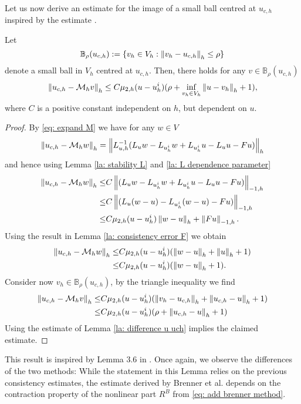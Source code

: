 Let us now derive an estimate for the image of a small ball centred at $u_{c,h}$ inspired by the estimate \cite[Lemma 3.6]{BGN+2011}.
\begin{lemma} \label{la: mapping property of M}
	Let 
	\[
		\mathbb B_\rho(u_{c,h}):=\{v_h \in V_h: \left\lVert v_h - u_{c,h} \right\rVert_{h} \leq \rho\}
	\]
	denote a small ball in $V_h$ centred at $u_{c,h}$. 
	Then, there holds for any $v \in \mathbb B_\rho(u_{c,h})$
	\[
		\left\lVert u_{c,h} - \mathcal M_h v \right\rVert_{h} \leq C \mu_{2,h}(u - u^i_h) (\rho+ \inf_{v_h \in V_h} \left\lVert u-v_h \right\rVert_{h}+1),
	\]
	where $C$ is a positive constant independent on $h$, but dependent on $u$.
\end{lemma}
\begin{proof}
By \eqref{eq: expand M} we have for any $w \in V$
	\begin{align}
		\left\lVert u_{c,h} - \mathcal M_h w \right\rVert_{h} = \left\lVert L_{u,h}^{-1}(L_u w - L_{u^i_h} w + L_{u^i_h}u - L_u u - Fu) \right\rVert_{h}
	\end{align}
	and hence using Lemma \ref{la: stability L} and \ref{la: L dependence parameter}
	\begin{align*}
		\left\lVert u_{c,h} - \mathcal M_h w \right\rVert_{h} 
		\leq& C\left\lVert (L_u w - L_{u^i_h} w + L_{u^i_h} u- L_u u - Fu) \right\rVert_{-1,h} \nonumber\\
		\leq& C\left\lVert (L_u (w-u) - L_{u^i_h} (w-u) - Fu) \right\rVert_{-1,h} \nonumber\\
				\leq& C \mu_{2,h}(u - u^i_h) \left\lVert w-u \right\rVert_{h} +\left\lVert Fu \right\rVert_{-1,h}.
	\end{align*}
	Using the result in Lemma \ref{la: consistency error F} we obtain
	\begin{align*}
		\left\lVert u_{c,h} - \mathcal M_h w \right\rVert_{h} \leq& C \mu_{2,h}(u - u^i_h) (\left\lVert w-u \right\rVert_{h}+\left\lVert u \right\rVert_{h} +1)\nonumber \\
		\leq & C \mu_{2,h}(u - u^i_h) (\left\lVert w-u \right\rVert_{h}+1).
	\end{align*}
	Consider now $v_h \in \mathbb B_\rho(u_{c,h})$, by the triangle inequality we find 
	\begin{align}
		\left\lVert u_{c,h} - \mathcal M_h v \right\rVert_{h} 
			\leq& C \mu_{2,h}(u - u^i_h) (\left\lVert v_h-u_{c,h} \right\rVert_{h}+ \left\lVert u_{c,h}-u \right\rVert_{h} +1) \nonumber \\
			\leq& C \mu_{2,h}(u - u^i_h) (\rho+ \left\lVert u_{c,h}-u \right\rVert_{h} +1)			
	\end{align}
Using the estimate of Lemma \ref{la: difference u uch} implies the claimed estimate.
\end{proof}

This result is inspired by Lemma 3.6 in \cite{BGN+2011}. Once again, we observe the differences of the two methods: While the statement in this Lemma relies on the previous consistency estimates, the estimate derived by Brenner et al. depends on the contraction property of the nonlinear part $R^B$ from \eqref{eq: add brenner method}. 

